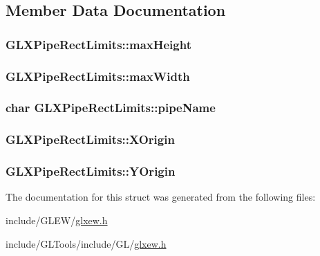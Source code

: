\subsection{Member Data Documentation}
\hypertarget{struct_g_l_x_pipe_rect_limits_a27572e499c0d3280031c2ad8e387c0c1}{
\subsubsection[{max\-Height}]{ G\-L\-X\-Pipe\-Rect\-Limits\-::max\-Height}}\label{struct_g_l_x_pipe_rect_limits_a27572e499c0d3280031c2ad8e387c0c1}
\hypertarget{struct_g_l_x_pipe_rect_limits_a8662c7a712b30620e25fc994adf337a1}{
\subsubsection[{max\-Width}]{ G\-L\-X\-Pipe\-Rect\-Limits\-::max\-Width}}\label{struct_g_l_x_pipe_rect_limits_a8662c7a712b30620e25fc994adf337a1}
\hypertarget{struct_g_l_x_pipe_rect_limits_a048e870a1e04bc5321d629e803cc04e1}{
\subsubsection[{pipe\-Name}]{\setlength{\rightskip}{0pt plus 5cm}char G\-L\-X\-Pipe\-Rect\-Limits\-::pipe\-Name}}\label{struct_g_l_x_pipe_rect_limits_a048e870a1e04bc5321d629e803cc04e1}
\hypertarget{struct_g_l_x_pipe_rect_limits_a3e5a965059d9f5d2ca42acd35af5bb9b}{
\subsubsection[{X\-Origin}]{ G\-L\-X\-Pipe\-Rect\-Limits\-::\-X\-Origin}}\label{struct_g_l_x_pipe_rect_limits_a3e5a965059d9f5d2ca42acd35af5bb9b}
\hypertarget{struct_g_l_x_pipe_rect_limits_a50e06bcf0dae95854be7d93a515199e9}{
\subsubsection[{Y\-Origin}]{ G\-L\-X\-Pipe\-Rect\-Limits\-::\-Y\-Origin}}\label{struct_g_l_x_pipe_rect_limits_a50e06bcf0dae95854be7d93a515199e9}


The documentation for this struct was generated from the following files\-:\begin{DoxyCompactItemize}
\item 
include/\-G\-L\-E\-W/\hyperlink{_g_l_e_w_2glxew_8h}{glxew.\-h}\item 
include/\-G\-L\-Tools/include/\-G\-L/\hyperlink{_g_l_tools_2include_2_g_l_2glxew_8h}{glxew.\-h}\end{DoxyCompactItemize}
